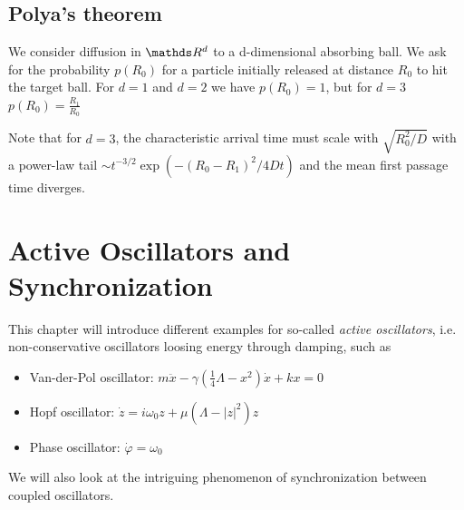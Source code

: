 \documentclass{notebook}
\begin{document}
\section{Polya's theorem}

We consider diffusion in $\R^d$ to a d-dimensional absorbing ball. We ask for the probability $p(R_0)$ for a particle initially released at distance $R_0$ to hit the target ball. For $d = 1$ and $d = 2$ we have $p(R_0) = 1$, but for $d = 3$ $p(R_0) = \frac{R_1}{R_0}$

Note that for $d = 3$, the characteristic arrival time must scale with $\sqrt{R^2_0/D}$ with a power-law tail $\sim t^{-3/2} \exp(- (R_0-R_1)^2/4 D t)$ and the mean first passage time diverges.

\chapter{Active Oscillators and Synchronization}

This chapter will introduce different examples for so-called \textit{active oscillators}, i.e. non-conservative oscillators loosing energy through damping, such as
%
\begin{itemize}
	\item{Van-der-Pol oscillator: $m \ddot{x} - \gamma \left(\frac{1}{4} \Lambda - x^2 \right) \dot{x} + kx = 0$}
	\item{Hopf oscillator: $\dot{z} = i \omega_0 z + \mu(\Lambda - |z|^2)z$}
	\item{Phase oscillator: $\dot{\varphi} = \omega_0$}
\end{itemize}
%
We will also look at the intriguing phenomenon of synchronization between coupled oscillators. 
\end{document}

